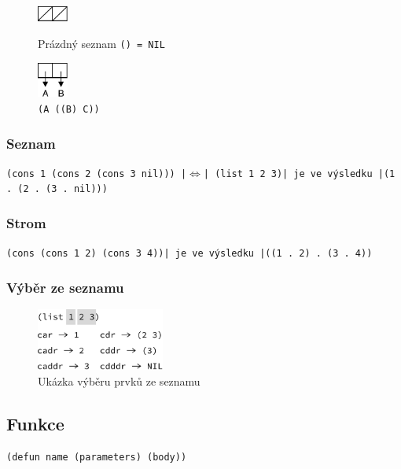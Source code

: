 \documentclass{szzclass}
\begin{document}
\begin{figure}[H]
\centering
\begin{minipage}{.5\textwidth}
  \centering
  \includegraphics[width=1cm]{topics/bi-wsi-si-15/images/list-empty}
  \caption{Prázdný seznam \texttt{() = NIL}}
\end{minipage}%
\begin{minipage}{.5\textwidth}
  \centering
  \includegraphics[width=1cm]{topics/bi-wsi-si-15/images/list-cons}
  \caption{\texttt{(A ((B) C))}}
\end{minipage}%
\end{figure}

\subsubsection*{Seznam}
\texttt{(cons 1 (cons 2 (cons 3 nil))) |$\Leftrightarrow$| (list 1 2 3)| je ve výsledku |(1 . (2 . (3 . nil)))}

\subsubsection*{Strom}
\texttt{(cons (cons 1 2) (cons 3 4))| je ve výsledku |((1 . 2) . (3 . 4))}

\subsubsection*{Výběr ze seznamu}
\begin{figure}[H]
  \centering
  \includegraphics[width=4.2cm]{topics/bi-wsi-si-15/images/list-cdr}
  \caption{Ukázka výběru prvků ze seznamu}
\end{figure}

\subsection{Funkce}
\texttt{(defun name (parameters) (body))}
\end{document}
